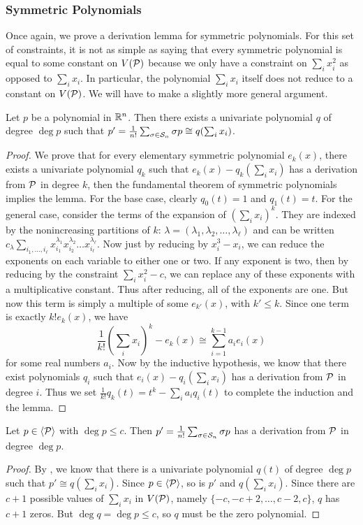 \subsubsection{Symmetric Polynomials}
Once again, we prove a derivation lemma for symmetric polynomials. For this set of constraints, it is not as simple as saying that every symmetric polynomial is equal to some constant on $V(\mathcal P)$ because we only have a constraint on $\sum_i x_i^2$ as opposed to $\sum_i x_i$. In particular, the polynomial $\sum_i x_i$ itself does not reduce to a constant on $V(\mathcal P)$. We will have to make a slightly more general argument.
\begin{lemma}\label{lem:bpca-symmetric}
Let $p$ be a polynomial in $\mathbb R^n$. Then there exists a univariate polynomial $q$ of degree $\deg p$ such that $p' = \frac{1}{n!}\sum_{\sigma \in \mathcal S_n} \sigma p \cong q(\sum_i x_i)$.
\end{lemma}
\begin{proof}
We prove that for every elementary symmetric polynomial $e_k(x)$, there exists a univariate polynomial $q_k$ such that $e_k(x) - q_k(\sum_i x_i)$ has a derivation from $\mathcal P$ in degree $k$, then the fundamental theorem of symmetric polynomials implies the lemma. For the base case, clearly $q_0(t) = 1$ and $q_1(t) = t$. For the general case, consider the terms of the expansion of $\left(\sum_i x_i\right)^k$. They are indexed by the nonincreasing partitions of $k$: $\lambda = (\lambda_1, \lambda_2, \dots, \lambda_\ell)$ and can be written $c_\lambda \sum_{i_1,\dots,i_\ell} x_{i_1}^{\lambda_1} x_{i_2}^{\lambda_2} \dots x_{i_\ell}^{\lambda_\ell}$. Now just by reducing by $x_i^3 - x_i$, we can reduce the exponents on each variable to either one or two. If any exponent is two, then by reducing by the constraint $\sum_i x_i^2 - c$, we can replace any of these exponents with a multiplicative constant. Thus after reducing, all of the exponents are one. But now this term is simply a multiple of some $e_{k'}(x)$, with $k' \leq k$. Since one term is exactly $k!e_k(x)$, we have
\[\frac{1}{k!}\left(\sum_i x_i\right)^k - e_k(x) \cong \sum_{i=1}^{k-1} a_i e_i(x)\]
for some real numbers $a_i$. Now by the inductive hypothesis, we know that there exist polynomials $q_i$ such that $e_i(x) - q_i(\sum_i x_i)$ has a derivation from $\mathcal P$ in degree $i$. Thus we set $\frac{1}{k!}q_k(t) = t^k - \sum_i a_i q_i(t)$ to complete the induction and the lemma.
\end{proof}
\begin{corollary}
Let $p \in \langle \mathcal P \rangle$ with $\deg p \leq c$. Then $p' = \frac{1}{n!}\sum_{\sigma \in \mathcal S_n} \sigma p$ has a derivation from $\mathcal P$ in degree $\deg p$. 
\end{corollary}
\begin{proof}
By , we know that there is a univariate polynomial $q(t)$ of degree $\deg p$ such that $p' \cong q(\sum_i x_i)$. Since $p \in \langle \mathcal P \rangle$, so is $p'$ and $q(\sum_i x_i)$. Since there are $c+1$ possible values of $\sum_i x_i$ in $V(\mathcal P)$, namely $\{-c, -c+2, \dots, c-2, c\}$, $q$ has $c+1$ zeros. But $\deg q = \deg p \leq c$, so $q$ must be the zero polynomial.
\end{proof}


